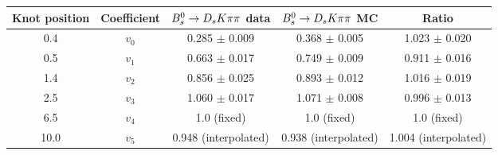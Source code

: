 \begin{tabular}{c c c c c}
\hline
\hline
Knot position & Coefficient & ${{B}^0_{s}}\rightarrow{\ensuremath{{D}_{s}}}{\ensuremath{K}}{\ensuremath{\pi}}{\ensuremath{\pi}}$ data & ${{B}^0_{s}}\rightarrow{\ensuremath{{D}_{s}}}{\ensuremath{K}}{\ensuremath{\pi}}{\ensuremath{\pi}}$ MC & Ratio \\
\hline
0.4 & $v_{0}$ & 0.285 $\pm$ 0.009 & 0.368 $\pm$ 0.005 & 1.023 $\pm$ 0.020\\
0.5 & $v_{1}$ & 0.663 $\pm$ 0.017 & 0.749 $\pm$ 0.009 & 0.911 $\pm$ 0.016\\
1.4 & $v_{2}$ & 0.856 $\pm$ 0.025 & 0.893 $\pm$ 0.012 & 1.016 $\pm$ 0.019\\
2.5 & $v_{3}$ & 1.060 $\pm$ 0.017 & 1.071 $\pm$ 0.008 & 0.996 $\pm$ 0.013\\
6.5 & $v_{4}$ &  1.0 (fixed) & 1.0 (fixed) & 1.0 (fixed)\\
10.0 & $v_{5}$ & 0.948 (interpolated) & 0.938 (interpolated) & 1.004 (interpolated) \\
\hline
\hline
\end{tabular}
